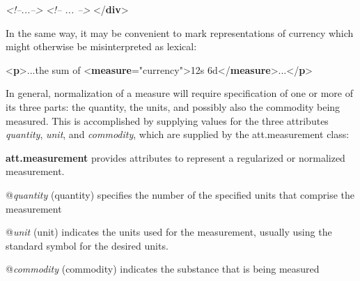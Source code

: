 \begin{shaded}
\textit{<!--...-->}\mbox{}\newline 
{}\mbox{}\newline 
\textit{<!-- ... -->}\mbox{}\newline 
{</\textbf{div}>}\end{shaded}\egroup\par \noindent  In the same way, it may be convenient to mark representations of currency which might otherwise be misinterpreted as lexical: \par\bgroup{}\exampleFont \begin{shaded}\noindent\mbox{}{<\textbf{p}>}...the sum of\mbox{}\newline 
{<\textbf{measure}\hspace*{1em}{type}="{currency}">}12s 6d{</\textbf{measure}>}...{</\textbf{p}>}\end{shaded}\egroup\par \par
In general, normalization of a measure will require specification of one or more of its three parts: the quantity, the units, and possibly also the commodity being measured. This is accomplished by supplying values for the three attributes {\itshape quantity}, {\itshape unit}, and {\itshape commodity}, which are supplied by the \textsf{att.measurement} class: 
\begin{sansreflist}
  
\item [\textbf{att.measurement}] provides attributes to represent a regularized or normalized measurement.\hfil\\[-10pt]\begin{sansreflist}
    \item[@{\itshape quantity}]
  (quantity) specifies the number of the specified units that comprise the measurement
    \item[@{\itshape unit}]
  (unit) indicates the units used for the measurement, usually using the standard symbol for the desired units.
    \item[@{\itshape commodity}]
  (commodity) indicates the substance that is being measured
\end{sansreflist}  
\end{sansreflist}
